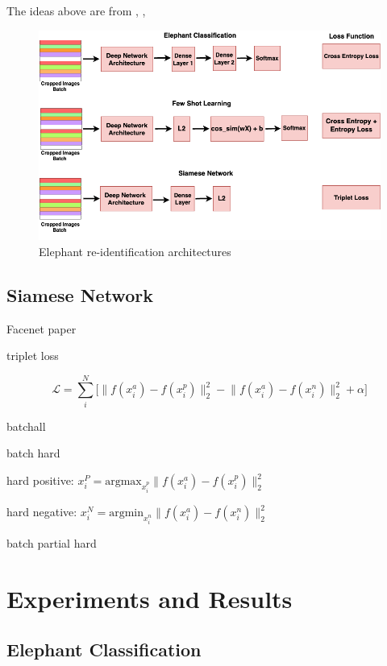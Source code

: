 \documentclass[10pt,twocolumn,letterpaper]{article}
\begin{document}
The ideas above are from \cite{fewshotlectures}, \cite{fewshotbaseline}, \cite{fewshotmetabaseline}


\begin{figure}[t]
  \centering
  \includegraphics[scale=0.275]{reidentification_network}
   \caption{Elephant re-identification architectures}
   \label{fig:reidentification_network}
\end{figure}

\subsection{Siamese Network}

Facenet paper

triplet loss

$$
\mathcal{L} = \sum_{i}^N \Big[ \lVert f(x_i^a) - f(x_i^p)\rVert_2^2 - \lVert f(x_i^a) - f(x_i^n)\rVert_2^2  + \alpha \Big]
$$

batchall

batch hard

hard positive: $x_i^P = \text{argmax}_{x_i^p}  \lVert f(x_i^a) - f(x_i^p)\rVert_2^2$

hard negative: $x_i^N = \text{argmin}_{x_i^n}  \lVert f(x_i^a) - f(x_i^n)\rVert_2^2$

batch partial hard



\section{Experiments and Results}
\label{sec:expresults} 

\subsection{Elephant Classification}
\end{document}
